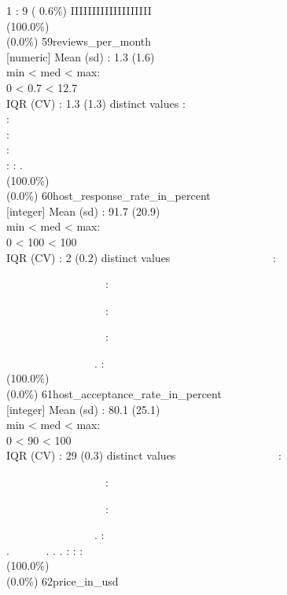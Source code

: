 \documentclass[
  journal,
]{IEEEtran}%
\begin{document}
1 : 9 ( 0.6\%) \textbar{} \textbar IIIIIIIIIIIIIIIIIII ~ \\
(100.0\%) \\
(0.0\%) \textbar{} \textbar{} 59\textbar reviews\_per\_month\\
{[}numeric{]} \textbar Mean (sd) : 1.3 (1.6)\\
min \textless{} med \textless{} max:\\
0 \textless{} 0.7 \textless{} 12.7\\
IQR (CV) : 1.3 (1.3)  distinct values \textbar{} \textbar:\\
:\\
:\\
:\\
: : . \\
(100.0\%) \\
(0.0\%) \textbar{} \textbar{}
60\textbar host\_response\_rate\_in\_percent\\
{[}integer{]} \textbar Mean (sd) : 91.7 (20.9)\\
min \textless{} med \textless{} max:\\
0 \textless{} 100 \textless{} 100\\
IQR (CV) : 2 (0.2)  distinct values \textbar{}
\textbar~~~~~~~~~~~~~~~~~~:\\
\strut ~~~~~~~~~~~~~~~~~~:\\
\strut ~~~~~~~~~~~~~~~~~~:\\
\strut ~~~~~~~~~~~~~~~~~~:\\
\strut ~~~~~~~~~~~~~~~~. : \\
(100.0\%) \\
(0.0\%) \textbar{} \textbar{}
61\textbar host\_acceptance\_rate\_in\_percent\\
{[}integer{]} \textbar Mean (sd) : 80.1 (25.1)\\
min \textless{} med \textless{} max:\\
0 \textless{} 90 \textless{} 100\\
IQR (CV) : 29 (0.3)  distinct values \textbar{}
\textbar~~~~~~~~~~~~~~~~~~:\\
\strut ~~~~~~~~~~~~~~~~~~:\\
\strut ~~~~~~~~~~~~~~~~~~:\\
\strut ~~~~~~~~~~~~~~~~. :\\
. ~~~~~~. . . : : : \\
(100.0\%) \\
(0.0\%) \textbar{} \textbar{} 62\textbar price\_in\_usd\\
\end{document}
